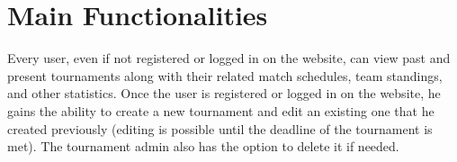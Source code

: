 \section{Main Functionalities}

\noindent Every user, even if not registered or logged in on the website, can view past and present tournaments along with their related match schedules, team standings,
and other statistics. Once the user is registered or logged in on the website, he gains the ability to create a new  tournament and edit an existing one that he created previously (editing is possible until the deadline of the tournament is met). The tournament admin also has the option to delete it if needed. \\

